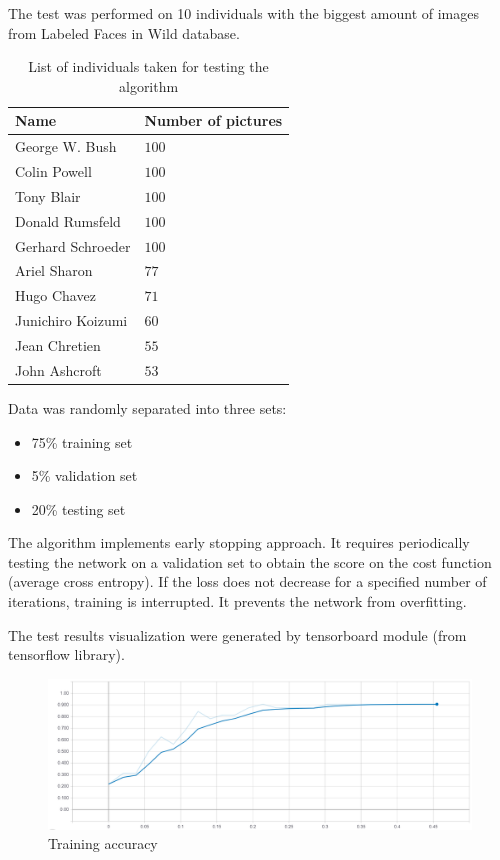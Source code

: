 The test was performed on 10 individuals with the biggest amount of images from Labeled Faces in Wild database. 

\begin{table}[H]
	\centering
	\caption{List of individuals taken for testing the algorithm}
    \begin{tabular}{ | l | l |}
    \hline
    \rowcolor{lightgray}
    Name &  Number of pictures \\ \hline
	George W. Bush & $100$\\  \hline  
	Colin Powell & $100$ \\ \hline    
	Tony Blair & $100$\\\hline
    Donald Rumsfeld  & $100$ \\ \hline
    Gerhard Schroeder  & $100$\\ \hline
    Ariel Sharon &  $77$  \\ \hline
	Hugo Chavez & $71$\\\hline
    Junichiro Koizumi  & $60$\\\hline    
    Jean Chretien  & $55$\\\hline
    John Ashcroft  & $53$\\
    \hline
    \end{tabular}
\end{table}

Data was randomly separated into three sets:
\begin{itemize}
\itemsep0em 
\item 75\% training set
\item 5\% validation set
\item 20\% testing set
\end{itemize}

The algorithm implements early stopping approach. It requires periodically testing the network on a validation set to obtain the score on the cost function (average cross entropy). If the loss does not decrease for a specified number of iterations, training is interrupted. It prevents the network from overfitting. 

The test results visualization were generated by tensorboard module (from tensorflow library).

\begin{figure}[H]
\centering
\includegraphics[scale=0.5]{img/train_acc.png}
\caption{Training accuracy}
\end{figure}

